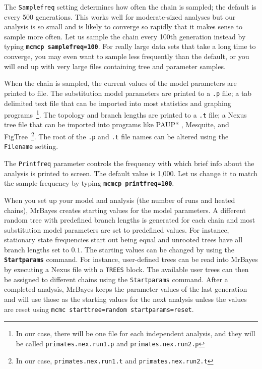 \documentclass[12pt]{book}
\newcommand{\ttt}[1]{\texttt{#1}}
\newcommand{\tb}[1]{\ttt{\textbf{#1}}}
\begin{document}
The \texttt{Samplefreq} setting determines how often the chain is sampled; the default is every 500
generations. This works well for moderate-sized analyses but our analysis is so small and is likely
to converge so rapidly that it makes sense to sample more often. Let us sample the chain every
100th generation instead by typing \tb{mcmcp samplefreq=100}. For really large data sets that take
a long time to converge, you may even want to sample less frequently than the default, or you will
end up with very large files containing tree and parameter samples.

When the chain is sampled, the current values of the model parameters are printed to file. The
substitution model parameters are printed to a \texttt{.p} file; a tab delimited text file that can
be imported into most statistics and graphing programs~\footnote{In our case, there will be one
file for each independent analysis, and they will be called \texttt{primates.nex.run1.p} and
\texttt{primates.nex.run2.p}}. The topology and branch lengths are printed to a \texttt{.t} file; a
Nexus tree file that can be imported into programs like PAUP* \citep{swofford98}, Mesquite, and
FigTree~\footnote{In our case, \texttt{primates.nex.run1.t} and \texttt{primates.nex.run2.t}}. The
root of the \texttt{.p} and \texttt{.t} file names can be altered using the \texttt{Filename}
setting.

The \texttt{Printfreq} parameter controls the frequency with which brief info about the analysis is
printed to screen. The default value is 1,000. Let us change it to match the sample frequency by
typing \tb{mcmcp printfreq=100}.

When you set up your model and analysis (the number of runs and heated chains), MrBayes creates
starting values for the model parameters. A different random tree with predefined branch lengths is
generated for each chain and most substitution model parameters are set to predefined values. For
instance, stationary state frequencies start out being equal and unrooted trees have all branch
lengths set to $0.1$. The starting values can be changed by using the \tb{Startparams} command.
For instance, user-defined trees can be read into MrBayes by executing a Nexus file with a
\texttt{TREES} block. The available user trees can then be assigned to different chains using the
\texttt{Startparams} command. After a completed analysis, MrBayes keeps the parameter values of the
last generation and will use those as the starting values for the next analysis unless the values
are reset using \texttt{mcmc starttree=random startparams=reset}.
\end{document}
